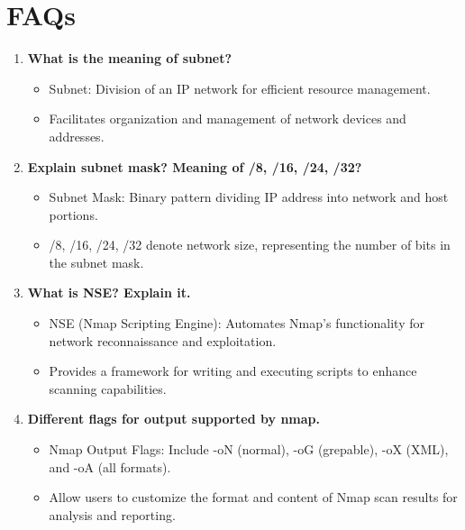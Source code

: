 \documentclass[11pt]{article}
\begin{document}
% 

\section{FAQs}
\begin{enumerate}
    \item \textbf{What is the meaning of subnet?}
          \begin{itemize}
              \item Subnet: Division of an IP network for efficient resource management.
              \item Facilitates organization and management of network devices and addresses.
          \end{itemize}

    \item \textbf{Explain subnet mask? Meaning of /8, /16, /24, /32?}
          \begin{itemize}
              \item Subnet Mask: Binary pattern dividing IP address into network and host portions.
              \item /8, /16, /24, /32 denote network size, representing the number of bits in the subnet mask.
          \end{itemize}

    \item \textbf{What is NSE? Explain it.}
          \begin{itemize}
              \item NSE (Nmap Scripting Engine): Automates Nmap's functionality for network reconnaissance and exploitation.
              \item Provides a framework for writing and executing scripts to enhance scanning capabilities.
          \end{itemize}

    \item \textbf{Different flags for output supported by nmap.}
          \begin{itemize}
              \item Nmap Output Flags: Include -oN (normal), -oG (grepable), -oX (XML), and -oA (all formats).
              \item Allow users to customize the format and content of Nmap scan results for analysis and reporting.
          \end{itemize}


\end{enumerate}
\end{document}
